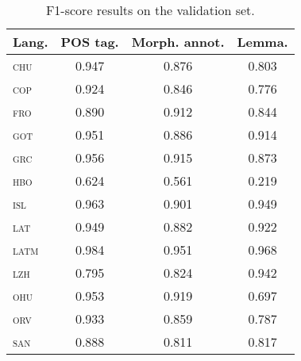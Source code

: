 \documentclass{../acl_latex.tex}
\begin{document}
\begin{table}[t]
\centering
\begin{tabular}{lccc}
\toprule
Lang.            & POS tag. & Morph. annot. & Lemma. \\ \midrule
\textsc{chu}     &  0.947   &  0.876        & 0.803  \\ 
\textsc{cop}     &  0.924   &  0.846        & 0.776  \\ 
\textsc{fro}     &  0.890   &  0.912        & 0.844  \\
\textsc{got}     &  0.951   &  0.886        & 0.914  \\
\textsc{grc}     &  0.956   &  0.915        & 0.873  \\
\textsc{hbo}     &  0.624   &  0.561        & 0.219  \\
\textsc{isl}     &  0.963   &  0.901        & 0.949  \\
\textsc{lat}     &  0.949   &  0.882        & 0.922  \\
\textsc{latm}    &  0.984   &  0.951        & 0.968  \\
\textsc{lzh}     &  0.795   &  0.824        & 0.942  \\
\textsc{ohu}     &  0.953   &  0.919        & 0.697  \\
\textsc{orv}     &  0.933   &  0.859        & 0.787  \\
\textsc{san}     &  0.888   &  0.811        & 0.817  \\ \bottomrule 
\end{tabular}
\caption{
    F1-score results on the validation set.
}
\label{table:validation_results}
\end{table}
\end{document}
